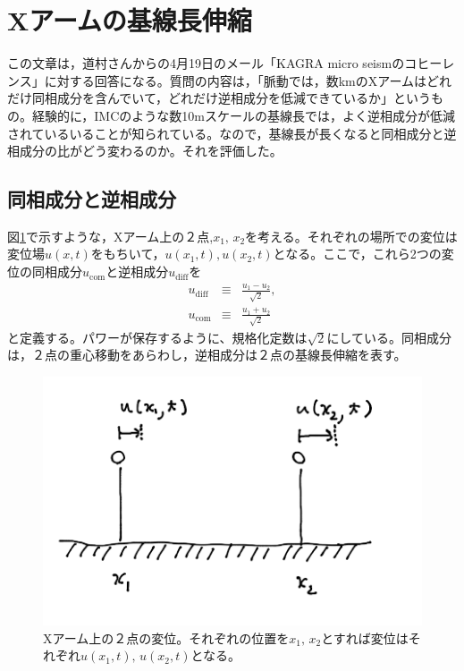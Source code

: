 
\section{Xアームの基線長伸縮}
この文章は，道村さんからの4月19日のメール「KAGRA micro seismのコヒーレンス」に対する回答になる。質問の内容は，「脈動では，数kmのXアームはどれだけ同相成分を含んでいて，どれだけ逆相成分を低減できているか」というもの。経験的に，IMCのような数10mスケールの基線長では，よく逆相成分が低減されているいることが知られている。なので，基線長が長くなると同相成分と逆相成分の比がどう変わるのか。それを評価した。


\subsection{同相成分と逆相成分}
図\ref{img:img_diffcomm}で示すような，Xアーム上の２点,$x_1,\,x_2$を考える。それぞれの場所での変位は変位場$u(x,t)$をもちいて，$u(x_1,t),u(x_2,t)$となる。ここで，これら2つの変位の同相成分$u_{\mathrm{com}}$と逆相成分$u_\mathrm{diff}$を
\begin{eqnarray}\label{eq:eq22}
  u_{\mathrm{diff}} &\equiv& \frac{u_{1}-u_{2}}{\sqrt{2}}, \\
  u_{\mathrm{com}}  &\equiv& \frac{u_{1}+u_{2}}{\sqrt{2}}
\end{eqnarray}
と定義する。パワーが保存するように、規格化定数は$\sqrt{2}$にしている。同相成分は，２点の重心移動をあらわし，逆相成分は２点の基線長伸縮を表す。


\begin{figure}[H]
  \begin{center}
    \includegraphics[width=11.5cm]{./xarm.png}
  \end{center}
  \caption{Xアーム上の２点の変位。それぞれの位置を$x_1,\,x_2$とすれば変位はそれぞれ$u(x_1,t),\,u(x_2,t)$となる。}\label{img:img_diffcomm}
\end{figure}


